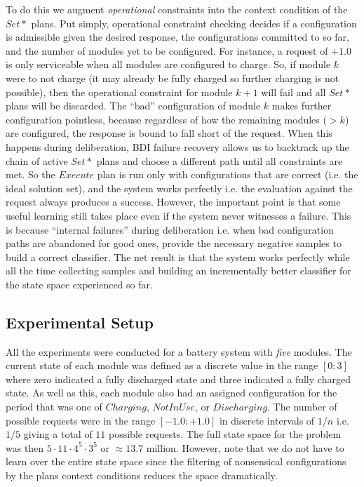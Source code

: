 To do this we augment {\em operational} constraints into the context condition of the $Set*$ plans. Put simply, operational constraint checking decides if a configuration is admissible given the desired response, the configurations committed to so far, and the number of modules yet to be configured. For instance, a request of $+1.0$ is only serviceable when all modules are configured to charge. So, if module $k$ were to not charge (it may already be fully charged so further charging is not possible), then the operational constraint for module $k+1$ will fail and all $Set*$ plans will be discarded. The ``bad'' configuration of module $k$ makes further configuration pointless, because regardless of how the remaining modules ($>k$) are configured, the response is bound to fall short of the request. When this happens during deliberation, BDI failure recovery allows us to backtrack up the chain of active $Set*$ plans and choose a different path until all constraints are met. So the $Execute$ plan is run only with configurations that are correct (i.e. the ideal solution set), and the system works perfectly i.e. the evaluation against the request always produces a success. However, the important point is that some useful learning still takes place even if the system never witnesses a failure. This is because ``internal failures'' during deliberation i.e. when bad configuration paths are abandoned for good ones, provide the necessary negative samples to build a correct classifier. The net result is that the system works perfectly while all the time collecting samples and building an incrementally better classifier for the state space experienced so far. 





\subsection{Experimental Setup}\label{subsec:setup}

All the experiments were conducted for a battery system with {\em five} modules. The current state of each module was defined as a discrete value in the range $[0:3]$ where zero indicated a fully discharged state and three indicated a fully charged state. As well as this, each module also had an assigned configuration for the period that was one of $Charging$, $NotInUse$, or $Discharging$. The number of possible requests were in the range $[-1.0:+1.0]$ in discrete intervals of $1/n$ i.e. $1/5$ giving a total of $11$ possible requests. The full state space for the problem was then $5 \cdot 11 \cdot 4^5 \cdot 3^5$ or $\approx 13.7$ million. However, note that we do not have to learn over the entire state space since the filtering of nonsensical configurations by the plans context conditions reduces the space dramatically.

